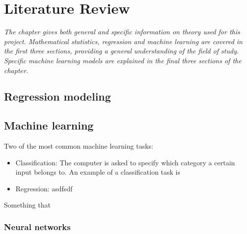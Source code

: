 \chapter{Literature Review}
\emph{The chapter gives both general and specific information on theory used for this project.  Mathematical statistics, regression and machine learning are covered in the first three sections, providing a general understanding of the field of study. Specific machine learning models are explained in the final three sections of the chapter. }

\section{Regression modeling}
	

\section{Machine learning}
	
	Two of the most common machine learning tasks: 
	\begin{itemize}
		\item{Classification:} The computer is asked to specify which category a certain input belongs to. An example of a classification task is  
		\item{Regression:} asdfsdf
	\end{itemize} \cite{BOOK:1}
	Something that \cite{WEBSITE:1}
\subsection{Neural networks}

